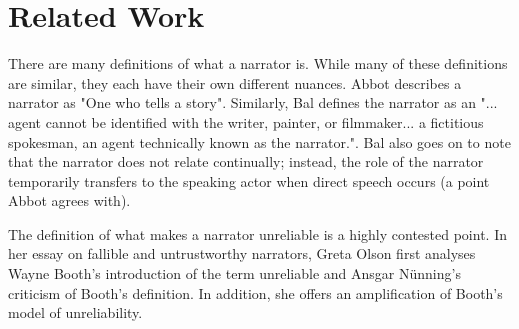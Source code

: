 \section{Related Work}
There are many definitions of what a narrator is. While many of these definitions are similar, they each have their own different nuances. Abbot describes a narrator as "One who tells a story"\cite[p. 238]{Abbot}. Similarly, Bal defines the narrator as an "... agent cannot be identified with the writer, painter, or filmmaker... a fictitious spokesman, an agent technically known as the narrator."\cite[p. 8]{Bal}. Bal also goes on to note that the narrator does not relate continually; instead, the role of the narrator temporarily transfers to the speaking actor when direct speech occurs (a point Abbot agrees with).

The definition of what makes a narrator unreliable is a highly contested point. In her essay on fallible and untrustworthy narrators, Greta Olson first analyses Wayne Booth's introduction of the term unreliable and Ansgar N\"unning's criticism of Booth's definition. In addition, she offers an amplification of Booth's model of unreliability\cite{Olson}.